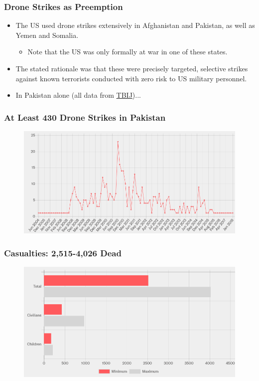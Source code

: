 \documentclass{beamer}
\begin{document}
\begin{frame} 
	\frametitle{\LARGE{Drone Strikes as Preemption}}
	\begin{itemize}
		\item The US used drone strikes extensively in Afghanistan and Pakistan, as well as Yemen and Somalia. \pause
		\begin{itemize}
			\item Note that the US was only formally at war in one of these states. \pause
		\end{itemize}
		\item The stated rationale was that these were precisely targeted, selective strikes against known terrorists conducted with zero risk to US military personnel. \pause
		\item In Pakistan alone (all data from \href{https://www.thebureauinvestigates.com/projects/drone-war}{TBIJ})... 
	\end{itemize}
\end{frame}

\begin{frame} 
	\frametitle{\LARGE{At Least 430 Drone Strikes in Pakistan}}
	\begin{figure}[ht!]
	\centering
	\includegraphics[width=\textwidth,height=\textheight,keepaspectratio]{Pakstrikes.png}
\end{figure}
\end{frame}

\begin{frame} 
	\frametitle{\LARGE{Casualties: 2,515-4,026 Dead}}
	\begin{figure}[ht!]
		\centering
		\includegraphics[width=\textwidth,height=\textheight,keepaspectratio]{Pakcas.png}
	\end{figure}
\end{frame}
\end{document}
